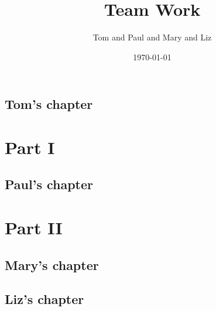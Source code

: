 \documentclass[draft]{book}
\title{Team Work}
\author{Tom and Paul and Mary and Liz}
\date{\today}
\begin{document}
\maketitle
\tableofcontents

\frontmatter
\chapter{Tom's chapter}


\mainmatter
\part{Part I}
\chapter{Paul's chapter}


\part{Part II}
\chapter{Mary's chapter}


\backmatter
\chapter{Liz's chapter}

\end{document}
